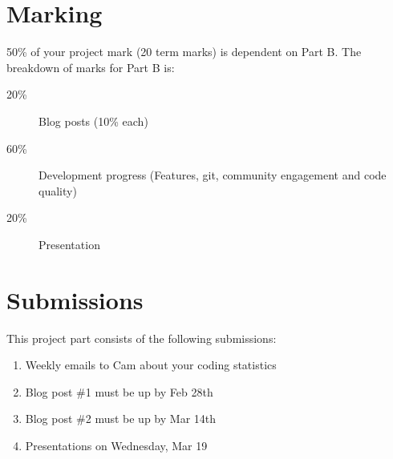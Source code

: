 \documentclass[letterpaper]{article}
\begin{document}
\section*{Marking}

50\% of your project mark (20 term marks) is dependent on Part B.  The
breakdown of marks for Part B is:

\begin{description}
\item[20\%] Blog posts (10\% each)
\item[60\%] Development progress (Features, git, community engagement and code quality)
\item[20\%] Presentation
\end{description}

\section{Submissions}

This project part consists of the following submissions:

\begin{enumerate}
	\item Weekly emails to Cam about your coding statistics
	\item Blog post \#1 must be up by Feb 28th
	\item Blog post \#2 must be up by Mar 14th
	\item Presentations on Wednesday, Mar 19
\end{enumerate}



\end{document}
